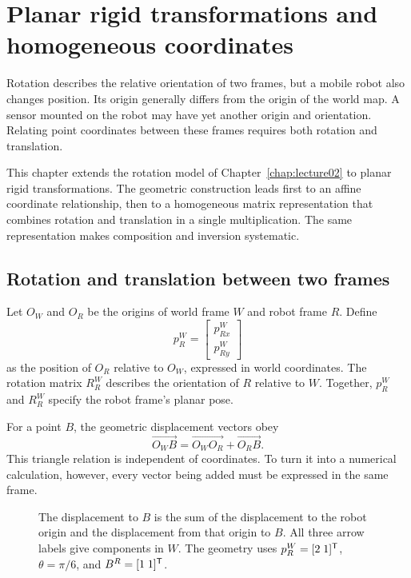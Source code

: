 \chapter{Planar rigid transformations and homogeneous coordinates}
\label{chap:lecture03}

Rotation describes the relative orientation of two frames, but a mobile robot
also changes position. Its origin generally differs from the origin of the
world map. A sensor mounted on the robot may have yet another origin and
orientation. Relating point coordinates between these frames requires both
rotation and translation.

This chapter extends the rotation model of Chapter~\ref{chap:lecture02} to
planar rigid transformations. The geometric construction leads first to an
affine coordinate relationship, then to a homogeneous matrix representation
that combines rotation and translation in a single multiplication. The same
representation makes composition and inversion systematic.

\section{Rotation and translation between two frames}
Let $O_W$ and $O_R$ be the origins of world frame $W$ and robot frame $R$.
Define
\[
 p_R^W=\begin{bmatrix}p_{Rx}^W\\p_{Ry}^W\end{bmatrix}
\]
as the position of $O_R$ relative to $O_W$, expressed in world coordinates.
The rotation matrix $R_R^W$ describes the orientation of $R$ relative to $W$.
Together, $p_R^W$ and $R_R^W$ specify the robot frame's planar pose.

For a point $B$, the geometric displacement vectors obey
\begin{equation}
 \overrightarrow{O_WB}=\overrightarrow{O_WO_R}+\overrightarrow{O_RB}.
 \label{eq:l03-vector-sum}
\end{equation}
This triangle relation is independent of coordinates. To turn it into a
numerical calculation, however, every vector being added must be expressed
in the same frame.

\begin{figure}[htbp]
\centering
\caption{The displacement to $B$ is the sum of the displacement to the robot
origin and the displacement from that origin to $B$. All three arrow labels
give components in $W$. The geometry uses $p_R^W=[2\;1]^{\mathsf T}$,
$\theta=\pi/6$, and $B^R=[1\;1]^{\mathsf T}$.}
\label{fig:l03-geometry}
\end{figure}

